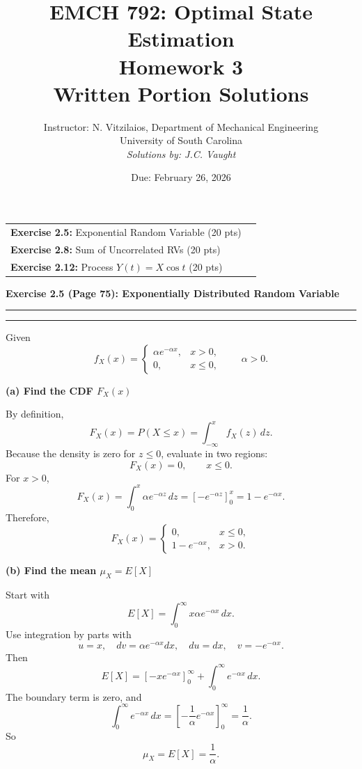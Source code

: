 \documentclass[12pt]{article}
\title{EMCH 792: Optimal State Estimation \\ Homework 3 \\ \large{Written Portion Solutions}}
\author{Instructor: N. Vitzilaios, Department of Mechanical Engineering \\ University of South Carolina \\ \textit{Solutions by: J.C. Vaught}}
\date{Due: February 26, 2026}
\newcommand{\question}[1]{%
  \clearpage
  \vspace{0.5cm}
  {\noindent\normalsize \textbf{#1}}
  \vspace{0.2cm}
  \hrule
  \vspace{0.1cm}
  \hrule
  \vspace{0.3cm}
}
\begin{document}
\maketitle
\setlength{\parindent}{0pt}

\begin{center}
\begin{tcolorbox}[colback=white, colframe=gray!50!black, colbacktitle=gray!20!white,
                  coltitle=black, sharp corners, boxrule=1pt,
                  title=\Large\bfseries Table of Contents]
\begin{tabular}{p{}r}
\textbf{Exercise 2.5:} Exponential Random Variable (20 pts) \dotfill & \textbf{\pageref{ex:2.5}} \\[0.3em]
\textbf{Exercise 2.8:} Sum of Uncorrelated RVs (20 pts) \dotfill & \textbf{\pageref{ex:2.8}} \\[0.3em]
\textbf{Exercise 2.12:} Process $Y(t)=X\cos t$ (20 pts) \dotfill & \textbf{\pageref{ex:2.12}} \\
\end{tabular}
\vspace{0.2cm}
\end{tcolorbox}
\end{center}

\question{Exercise 2.5 (Page 75): Exponentially Distributed Random Variable}\label{ex:2.5}
Given
\[
f_X(x)=
\begin{cases}
\alpha e^{-\alpha x}, & x>0,\\
0, & x\le 0,
\end{cases}
\qquad \alpha > 0.
\]

\begin{stepbox}
\textbf{(a) Find the CDF $F_X(x)$}

By definition,
\[
F_X(x)=P(X\le x)=\int_{-\infty}^{x}f_X(z)\,dz.
\]
Because the density is zero for $z\le0$, evaluate in two regions:
\[
F_X(x)=0,\qquad x\le0.
\]
For $x>0$,
\[
F_X(x)=\int_0^x \alpha e^{-\alpha z}\,dz
=\left[-e^{-\alpha z}\right]_{0}^{x}
=1-e^{-\alpha x}.
\]
Therefore,
\[
F_X(x)=
\begin{cases}
0, & x\le0,\\
1-e^{-\alpha x}, & x>0.
\end{cases}
\]
\end{stepbox}

\begin{stepbox}
\textbf{(b) Find the mean $\mu_X=E[X]$}

Start with
\[
E[X]=\int_0^{\infty}x\alpha e^{-\alpha x}\,dx.
\]
Use integration by parts with
\[
u=x,\quad dv=\alpha e^{-\alpha x}dx,
\quad du=dx,\quad v=-e^{-\alpha x}.
\]
Then
\[
E[X]=\left[-xe^{-\alpha x}\right]_0^{\infty}+\int_0^{\infty}e^{-\alpha x}\,dx.
\]
The boundary term is zero, and
\[
\int_0^{\infty}e^{-\alpha x}\,dx
=\left[-\frac{1}{\alpha}e^{-\alpha x}\right]_0^{\infty}
=\frac{1}{\alpha}.
\]
So
\[
\mu_X=E[X]=\frac{1}{\alpha}.
\]
\end{stepbox}
\end{document}
